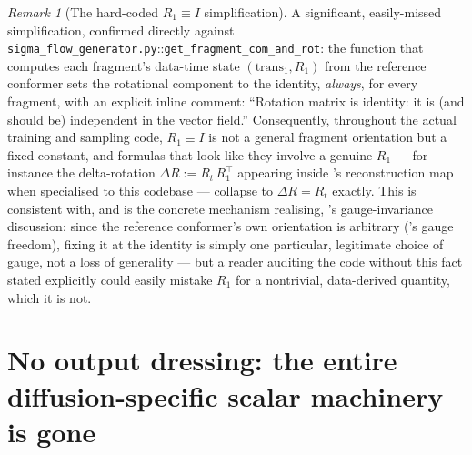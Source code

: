 \documentclass[11pt,a4paper]{report}
\theoremstyle{definition}
\theoremstyle{remark}
\newtheorem{remark}[remark]{Remark}
\newcommand{\file}[1]{\texttt{#1}}
\newcommand{\pyfunc}[1]{\texttt{#1}}
\begin{document}
\begin{remark}[The hard-coded $R_1\equiv I$ simplification]
\label{rem:r1-identity-simplification}
A significant, easily-missed simplification, confirmed directly against
\file{sigma\_flow\_generator.py}::\pyfunc{get\_fragment\_com\_and\_rot}: the
function that computes each fragment's data-time state
$(\mathrm{trans}_1,R_1)$ from the reference conformer sets the rotational
component to the identity, \emph{always}, for every fragment, with an
explicit inline comment: ``Rotation matrix is identity: it is (and should
be) independent in the vector field.'' Consequently, throughout the actual
training and sampling code, $R_1\equiv I$ is not a general fragment
orientation but a fixed constant, and formulas that look like they involve
a genuine $R_1$ --- for instance the delta-rotation
$\Delta R := R_t\,R_1^\top$ appearing inside
's reconstruction map when specialised
to this codebase --- collapse to $\Delta R=R_t$ exactly. This is
consistent with, and is the concrete mechanism realising,
's gauge-invariance discussion: since
the reference conformer's own orientation is arbitrary
('s gauge freedom), fixing it at the identity
is simply one particular, legitimate choice of gauge, not a loss of
generality --- but a reader auditing the code without this fact stated
explicitly could easily mistake $R_1$ for a nontrivial, data-derived
quantity, which it is not.
\end{remark}

\section{No output dressing: the entire diffusion-specific scalar machinery is gone}
\label{sec:sigmaflow-nodressing}
\end{document}
